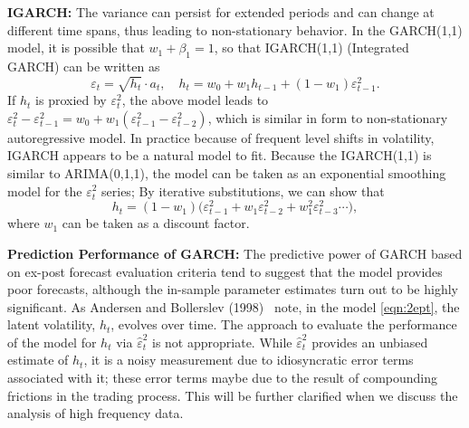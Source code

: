 \noindent\textbf{IGARCH:} The variance can persist for extended periods and can change at different time spans, thus leading to non-stationary behavior. In the GARCH(1,1) model, it is possible that $w_1 + \beta_1 = 1$, so that IGARCH(1,1) (Integrated GARCH) can be written as
	\begin{equation} \label{eqn:2eptsqrt}
	\varepsilon_t = \sqrt{h_t} \cdot a_t, \quad h_t = w_0 + w_1h_{t-1} + (1 - w_1) \varepsilon_{t-1}^2.
	\end{equation}
If $h_t$ is proxied by $\varepsilon_t^2$, the above model leads to $\varepsilon_t^2 - \varepsilon_{t-1}^2 = w_0 + w_1(\varepsilon_{t-1}^2 - \varepsilon_{t-2}^2)$, which is similar in form to non-stationary autoregressive model. In practice because of frequent level shifts in volatility, IGARCH appears to be a natural model to fit. Because the IGARCH(1,1) is similar to ARIMA(0,1,1), the model can be taken as an exponential smoothing model for the $\varepsilon_t^2$ series; By iterative substitutions, we can show that
	\begin{equation} \label{eqn:2ht1w}
	h_t = (1 - w_1) \big( \varepsilon_{t-1}^2 + w_1 \varepsilon_{t-2}^2 + w_1^2 \varepsilon_{t-3}^2 \cdots \big),
	\end{equation}
where $w_1$ can be taken as a discount factor. \twomedskip


\noindent\textbf{Prediction Performance of GARCH:} The predictive power of GARCH based on ex-post forecast evaluation criteria tend to suggest that the model provides poor forecasts, although the in-sample parameter estimates turn out to be highly significant. As Andersen and Bollerslev (1998)~\cite{andersen1998} note, in the model \eqref{eqn:2ept}, the latent volatility, $h_t$, evolves over time. The approach to evaluate the performance of the model for $h_t$ via $\hat{\varepsilon}_t^2$ is not appropriate. While $\hat{\varepsilon}_t^2$ provides an unbiased estimate of $h_t$, it is a noisy measurement due to idiosyncratic error terms associated with it; these error terms maybe due to the result of compounding frictions in the trading process. This will be further clarified when we discuss the analysis of high frequency data. \twomedskip


